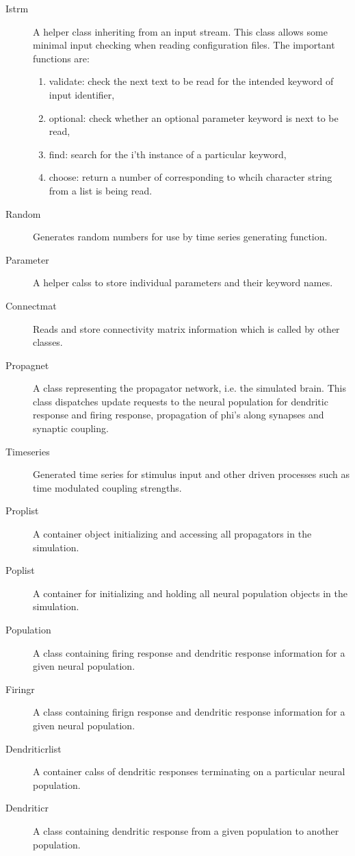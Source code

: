 \documentclass[12pt,a4paper]{article}
\begin{document}
\begin{description}
\item[Istrm] A helper class inheriting from an input stream. This class allows some minimal input checking when reading configuration files. The important functions are:
	\begin{enumerate}
	\item validate: check the next text to be read for the intended keyword of input identifier,
	\item optional: check whether an optional parameter keyword is next to be read,
	\item find: search for the i'th instance of a particular keyword,
	\item choose: return a number of corresponding to whcih character string from a list is being read.
	\end{enumerate}
\item[Random] Generates random numbers for use by time series generating function.
\item[Parameter] A helper calss to store individual parameters and their keyword names.
\item[Connectmat] Reads and store connectivity matrix information which is called by other classes.
\item[Propagnet] A class representing the propagator network, i.e. the simulated brain. This class dispatches update requests to the neural population for dendritic response and firing response, propagation of phi's along synapses and synaptic coupling.
\item[Timeseries] Generated time series for stimulus input and other driven processes such as time modulated coupling strengths.
\item[Proplist] A container object initializing and accessing all propagators in the simulation.
\item[Poplist] A container for initializing and holding all neural population objects in the simulation.
\item[Population] A class containing firing response and dendritic response information for a given neural population.
\item[Firingr] A class containing firign response and dendritic response information for a given neural population.
\item[Dendriticrlist] A container calss of dendritic responses terminating on a particular neural population.
\item[Dendriticr] A class containing dendritic response from a given population to another population.

\end{description}
\end{document}
